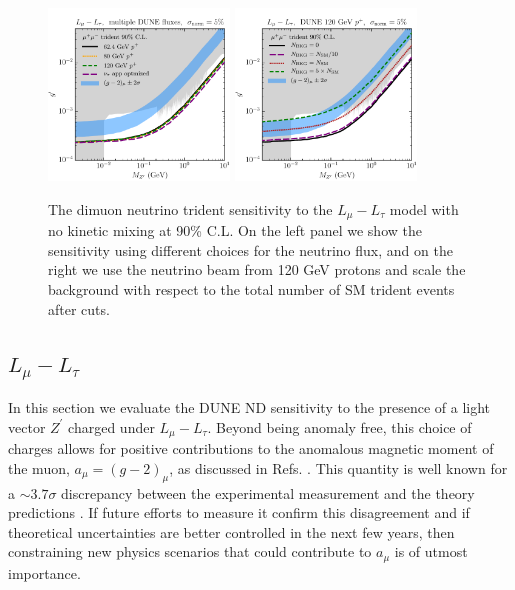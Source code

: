 \begin{figure}[t]
\centering
  \includegraphics[width=0.43\textwidth]{lmultau_fluxes.pdf}
 \includegraphics[width=0.43\textwidth]{lmultau_bkgs.pdf}
 \caption{The dimuon neutrino trident sensitivity to the $L_\mu - L_\tau$ model with no kinetic mixing at 90\% C.L. On the left panel we show the sensitivity using different choices for the neutrino flux, and on the right we use the neutrino beam from 120 GeV protons and scale the background with respect to the total number of SM trident events after cuts.\label{fig:Lmu_Ltau_varied}}
\end{figure}
%

\subsection{\boldmath$L_\mu - L_\tau$ \label{sec:lmu_ltau}}

In this section we evaluate the DUNE ND sensitivity to the presence of a light
vector $Z^\prime$ charged under $L_{\mu} - L_{\tau}$. Beyond being anomaly free, this choice of charges allows for positive contributions to the anomalous magnetic moment of the muon, $a_\mu = (g-2)_{\mu}$, as discussed in Refs. \cite{Baek:2001kca,Pospelov:2008zw,Kamada:2015era,Araki:2015mya,Kamada:2018zxi}. This quantity is well known for a $\sim 3.7\sigma$ discrepancy between the experimental measurement \cite{Bennett:2006fi} and the theory predictions \cite{Blum:2018mom,Keshavarzi:2018mgv}. If future efforts to measure it \cite{Grange:2015fou} confirm this disagreement and if theoretical uncertainties are better controlled in the next few years, then constraining new physics scenarios that could contribute to $a_\mu$ is of utmost importance. 

